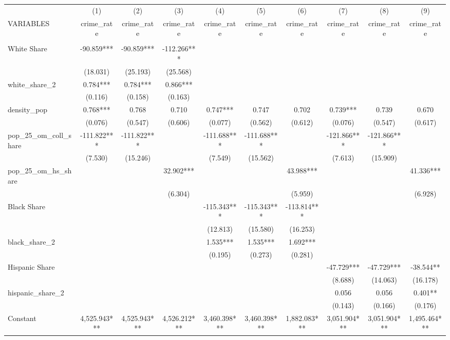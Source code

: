 \documentclass[]{article}
\begin{document}
\begin{tabular}{lccccccccc} \hline
 & (1) & (2) & (3) & (4) & (5) & (6) & (7) & (8) & (9) \\
VARIABLES & crime\_rate & crime\_rate & crime\_rate & crime\_rate & crime\_rate & crime\_rate & crime\_rate & crime\_rate & crime\_rate \\ \hline
 &  &  &  &  &  &  &  &  &  \\
White Share & -90.859*** & -90.859*** & -112.266*** &  &  &  &  &  &  \\
 & (18.031) & (25.193) & (25.568) &  &  &  &  &  &  \\
white\_share\_2 & 0.784*** & 0.784*** & 0.866*** &  &  &  &  &  &  \\
 & (0.116) & (0.158) & (0.163) &  &  &  &  &  &  \\
density\_pop & 0.768*** & 0.768 & 0.710 & 0.747*** & 0.747 & 0.702 & 0.739*** & 0.739 & 0.670 \\
 & (0.076) & (0.547) & (0.606) & (0.077) & (0.562) & (0.612) & (0.076) & (0.547) & (0.617) \\
pop\_25\_om\_coll\_share & -111.822*** & -111.822*** &  & -111.688*** & -111.688*** &  & -121.866*** & -121.866*** &  \\
 & (7.530) & (15.246) &  & (7.549) & (15.562) &  & (7.613) & (15.909) &  \\
pop\_25\_om\_hs\_share &  &  & 32.902*** &  &  & 43.988*** &  &  & 41.336*** \\
 &  &  & (6.304) &  &  & (5.959) &  &  & (6.928) \\
Black Share &  &  &  & -115.343*** & -115.343*** & -113.814*** &  &  &  \\
 &  &  &  & (12.813) & (15.580) & (16.253) &  &  &  \\
black\_share\_2 &  &  &  & 1.535*** & 1.535*** & 1.692*** &  &  &  \\
 &  &  &  & (0.195) & (0.273) & (0.281) &  &  &  \\
Hispanic Share &  &  &  &  &  &  & -47.729*** & -47.729*** & -38.544** \\
 &  &  &  &  &  &  & (8.688) & (14.063) & (16.178) \\
hispanic\_share\_2 &  &  &  &  &  &  & 0.056 & 0.056 & 0.401** \\
 &  &  &  &  &  &  & (0.143) & (0.166) & (0.176) \\
Constant & 4,525.943*** & 4,525.943*** & 4,526.212*** & 3,460.398*** & 3,460.398*** & 1,882.083*** & 3,051.904*** & 3,051.904*** & 1,495.464*** \\

\end{tabular}
\end{document}
